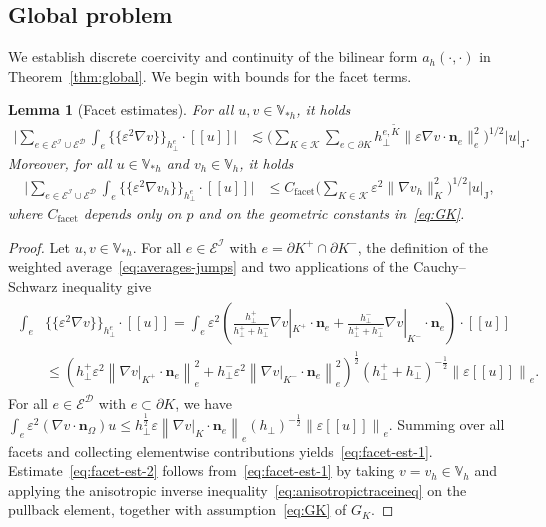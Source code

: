 \documentclass[a4paper,twoside,10pt]{article}
\newtheorem{lemma}[theorem]{Lemma}
\newcommand{\Vsh}{V_{\!\star \hspace*{-0.2mm}h}}
\newcommand*{\abs}[1]{\left|#1\right|}
\newcommand{\jmp}[1]{[\![ #1 ]\!]}
\newcommand{\eps}{\varepsilon}
\newcommand*{\norm}[1]{\left\|#1\right\|}
\newcommand{\calD}{\mathcal{D}}
\newcommand{\calE}{\mathcal{E}}
\newcommand{\calI}{\mathcal{I}}
\newcommand{\calK}{\mathcal{K}}
\newcommand{\bn}{\mathbf{n}}
\numberwithin{equation}{section}
\newcommand{\Vh}{\mathbb{V}_{\! h}}
\renewcommand{\Vsh}{\mathbb{V}_{*h}}
\newcommand{\hperp}{h_{\perp}}
\newcommand{\Kt}{\widetilde{K}}
\newcommand{\mvl}[1]{\{\!\!\{#1\}\!\!\}}
\begin{document}
	\subsection{Global problem}\label{sec:global}
	We establish discrete coercivity and continuity of the bilinear form $a_h(\cdot,\cdot)$ in Theorem~\ref{thm:global}.
	We begin with bounds for the facet terms.
	\begin{lemma}[Facet estimates]\label{lem:facet-est}
	For all $u,v\in \Vsh$, it holds
	\begin{align}
	\Big|\sum_{e\in\calE^{\calI}\cup \calE^\calD}\int_e \mvl{\eps^2 \nabla v}_{\hperp^e}\cdot \jmp{
	u}\Big|
	&\lesssim
	\Bigg(
	\sum_{K\in\calK}\sum_{e\subset\partial K}
	h_\perp^{e,\Kt}
	\|\eps \nabla v\cdot \bn_e\|_{e}^2
	\Bigg)^{1/2} 	
	|
	u|_{\mathrm{J}}.
	\label{eq:facet-est-1}
	\end{align}
	Moreover, for all $u\in \Vsh$ and $v_h\in \Vh$,  it holds
	\begin{align}
	\Big|
	\sum_{e\in\calE^{\calI} \cup \calE^\calD}\int_e \mvl{\eps^2 \nabla v_h}_{\hperp^e}\cdot \jmp{u}\Big|
	&\le
	C_{\mathrm{facet}}
	\Bigg(
	\sum_{K\in\calK}\eps^2\|\nabla v_h\|_{K}^2
	\Bigg)^{1/2}\abs{u}_{\mathrm{J}},
	\label{eq:facet-est-2}
	\end{align}
	where $C_{\mathrm{facet}}$ depends only on $p$ and on the geometric constants in~\eqref{eq:GK}.
	\end{lemma}
	\begin{proof}
	Let $u,v\in \Vsh$.
	For all $e\in\calE^{\calI}$ with $e=\partial K^+\cap \partial K^-$, 
	the definition of the weighted average~\eqref{eq:averages-jumps} and two applications of the Cauchy--Schwarz inequality give
	\begin{align*}
	\begin{split}
			\int_e  &\mvl{\eps^2\nabla v}_{\hperp^e} \cdot \jmp{u}  
	         = \int_e \eps^2 \left(\frac{h^+_\perp}{h^+_\perp+h^-_\perp}\nabla v|_{K^+}\cdot \bn_e + \frac{h^-_\perp}{h^+_\perp+h^-_\perp}\nabla v|_{K^-}\cdot \bn_e\right)\cdot \jmp{u}\\
	        & \leq 
	        \left( h^+_\perp\eps^2\norm{\nabla v{|_{K^+}}\cdot \bn_e}_{e}^2 + h^-_\perp \eps^2 \norm{\nabla v{|_{K^-}}\cdot \bn_e}_{e}^2 \right)^{\frac12} \left(h^+_\perp+h^-_\perp\right)^{-\frac12}\norm{\eps\jmp{u}}_{e}.
	    \end{split}
	\end{align*}
	For all $e\in\calE^{\calD}$ with $e\subset\partial K$, we have $\int_e  \eps^2 (\nabla v\cdot \bn_\Omega) u \leq 
	h_\perp^\frac12 \eps\norm{\nabla v{|_{K}}\cdot \bn_e}_{e} \left(h_\perp\right)^{-\frac12}\norm{\eps\jmp{u}}_{e}$.
	Summing over all facets and collecting elementwise contributions yields~\eqref{eq:facet-est-1}.
	Estimate~\eqref{eq:facet-est-2} follows from~\eqref{eq:facet-est-1} by taking $v=v_h\in \Vh$ and applying the anisotropic inverse inequality~\eqref{eq:anisotropictraceineq} on the pullback element, together with assumption~\eqref{eq:GK} of $G_K$.
	\end{proof}
\end{document}
